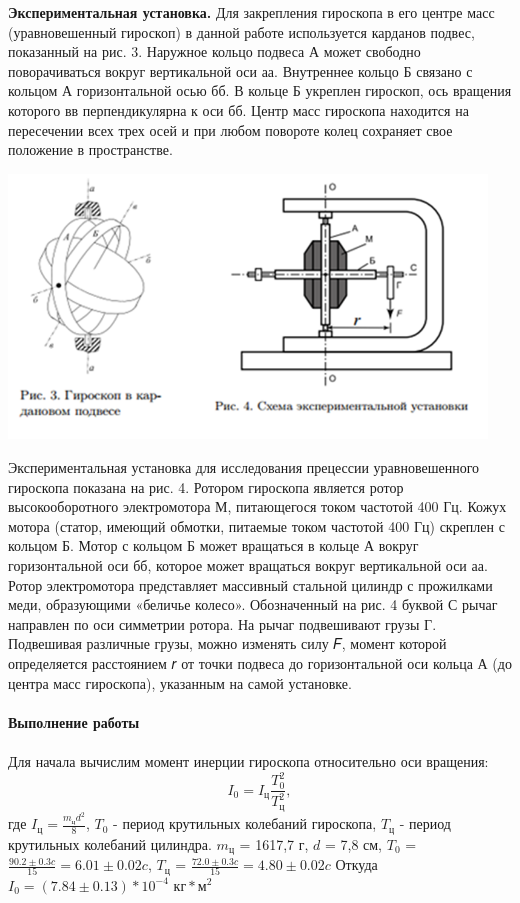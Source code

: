\documentclass[12pt]{article}
\begin{document}
	\textbf{Экспериментальная установка.} Для закрепления гироскопа в его
	центре масс (уравновешенный гироскоп) в данной работе используется
	карданов подвес, показанный на рис. 3. Наружное кольцо подвеса А может свободно поворачиваться вокруг вертикальной оси аа. Внутреннее кольцо Б связано с кольцом А горизонтальной осью бб. В кольце Б укреплен гироскоп, ось вращения которого вв перпендикулярна к оси бб. Центр масс гироскопа находится на пересечении всех трех осей и при любом повороте колец сохраняет свое положение в пространстве.
	\begin{center} 
		\includegraphics[width=5in]{4_2.png}
	\end{center}
	Экспериментальная установка для исследования прецессии уравновешенного гироскопа показана на рис. 4. Ротором гироскопа является
	ротор высокооборотного электромотора М, питающегося током частотой 400 Гц. Кожух мотора (статор, имеющий обмотки, питаемые током
	частотой 400 Гц) скреплен с кольцом Б. Мотор с
	кольцом Б может вращаться в кольце А вокруг
	горизонтальной оси бб, которое может вращаться вокруг вертикальной оси аа. Ротор электромотора представляет массивный стальной цилиндр с прожилками меди, образующими «беличье колесо». Обозначенный на рис. 4 буквой С рычаг направлен по оси симметрии ротора. На рычаг подвешивают грузы Г. Подвешивая различные грузы, можно изменять силу 𝐹, момент которой определяется расстоянием 𝑟 от точки подвеса до горизонтальной оси кольца А (до центра
	масс гироскопа), указанным на самой установке.
	\\ \\
	\textbf{\large Выполнение работы}
	\\ \\
	Для начала вычислим момент инерции гироскопа относительно оси вращения: $$I_0 = I_ц \frac{T_0^2}{T_ц^2},$$ где $I_ц = \frac{m_ц d^2}{8}$, $T_0$ - период крутильных колебаний гироскопа, $T_ц$ - период крутильных колебаний цилиндра.
	$m_ц$ = 1617,7 г,
	$d$ = 7,8 см,
	$T_0$ = $\frac{90.2 \pm 0.3 c}{15} = 6.01 \pm 0.02 c$,
	$T_ц$ = $\frac{72.0 \pm 0.3 c}{15} = 4.80 \pm 0.02 c$
	Откуда $I_0 = (7.84 \pm 0.13)*10^{-4}$ $кг*м^2$
	
\end{document}
